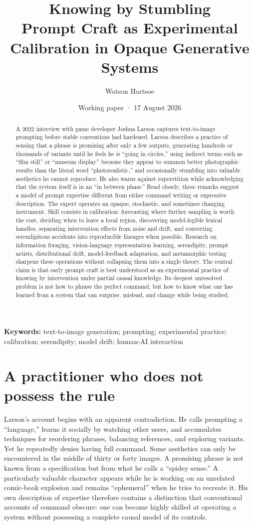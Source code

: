 \documentclass[11pt]{article}
\title{Knowing by Stumbling\\\large Prompt Craft as Experimental Calibration in Opaque Generative Systems}
\author{Watson Hartsoe}
\date{Working paper · 17 August 2026}
\begin{document}
\maketitle
\thispagestyle{firstpage}
\begin{abstract}
A 2022 interview with game developer Joshua Larson captures text-to-image prompting before stable conventions had hardened. Larson describes a practice of sensing that a phrase is promising after only a few outputs, generating hundreds or thousands of variants until he feels he is ``going in circles,'' using indirect terms such as ``film still'' or ``museum display'' because they appear to summon better photographic results than the literal word ``photorealistic,'' and occasionally stumbling into valuable aesthetics he cannot reproduce. He also warns against superstition while acknowledging that the system itself is in an ``in between phase.'' Read closely, these remarks suggest a model of prompt expertise different from either command writing or expressive description. The expert operates an opaque, stochastic, and sometimes changing instrument. Skill consists in calibration: forecasting where further sampling is worth the cost, deciding when to leave a local region, discovering model-legible lexical handles, separating intervention effects from noise and drift, and converting serendipitous accidents into reproducible lineages when possible. Research on information foraging, vision-language representation learning, serendipity, prompt artists, distributional drift, model-feedback adaptation, and metamorphic testing sharpens these operations without collapsing them into a single theory. The central claim is that early prompt craft is best understood as an experimental practice of knowing by intervention under partial causal knowledge. Its deepest unresolved problem is not how to phrase the perfect command, but how to know what one has learned from a system that can surprise, mislead, and change while being studied.
\end{abstract}
\textbf{Keywords:} text-to-image generation; prompting; experimental practice; calibration; serendipity; model drift; human-AI interaction

\section{A practitioner who does not possess the rule}
Larson’s account begins with an apparent contradiction. He calls prompting a ``language,'' learns it socially by watching other users, and accumulates techniques for reordering phrases, balancing references, and exploring variants. Yet he repeatedly denies having full command. Some aesthetics can only be encountered in the middle of thirty or forty images. A promising phrase is not known from a specification but from what he calls a ``spidey sense.'' A particularly valuable character appears while he is working on an unrelated comic-book explosion and remains ``ephemeral'' when he tries to recreate it. His own description of expertise therefore contains a distinction that conventional accounts of command obscure: one can become highly skilled at operating a system without possessing a complete causal model of its controls.
\end{document}
